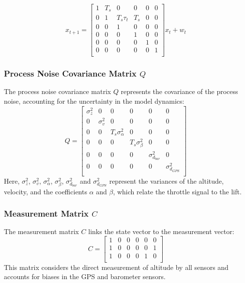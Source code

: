 \documentclass{article}
\begin{document}
    \begin{equation}
      x_{t+1} = 
      \begin{bmatrix}
        1 & T_s & 0 & 0 & 0 & 0\\
        0 & 1 & T_s \tau_t & T_s & 0 & 0\\
        0 & 0 & 1 & 0 & 0 & 0 \\
        0 & 0 & 0 & 1 & 0 & 0 \\
        0 & 0 & 0 & 0 & 1 & 0 \\
        0 & 0 & 0 & 0 & 0 & 1 \\
      \end{bmatrix}
      x_t + w_t
    \end{equation}

    \subsubsection*{Process Noise Covariance Matrix \( Q \)}
    The process noise covariance matrix \( Q \) represents the covariance of the process noise, accounting for the uncertainty in the model dynamics:
    \begin{equation}
    Q = 
    \begin{bmatrix}
    \sigma_z^2 & 0 & 0 & 0 & 0 & 0 \\
    0 & \sigma_v^2 & 0 & 0 & 0 & 0 \\
    0 & 0 & T_s \sigma_\alpha^2 & 0 & 0 & 0 \\
    0 & 0 & 0 & T_s \sigma_\beta^2 & 0 & 0 \\
    0 & 0 & 0 & 0 & \sigma^2_{d_{bar}} & 0 \\
    0 & 0 & 0 & 0 & 0 & \sigma^2_{d_{GPS}} \\
    \end{bmatrix}
    \end{equation}
    Here, \( \sigma_z^2 \), \( \sigma_v^2 \), \( \sigma_\alpha^2 \), \( \sigma_\beta^2 \), \( \sigma^2_{d_{bar}} \) and \( \sigma^2_{d_{GPS}} \) represent the variances of the altitude, velocity, and the coefficients \( \alpha \) and \( \beta \), which relate the throttle signal to the lift.

    \subsubsection*{Measurement Matrix \( C \)}
    The measurement matrix \( C \) links the state vector to the measurement vector:
    \begin{equation}
    C = 
    \begin{bmatrix}
    1 & 0 & 0 & 0 & 0 & 0 \\
    1 & 0 & 0 & 0 & 0 & 1 \\
    1 & 0 & 0 & 0 & 1 & 0 \\
    \end{bmatrix}
    \end{equation}
    This matrix considers the direct measurement of altitude by all sensors and accounts for biases in the GPS and barometer sensors.
\end{document}
